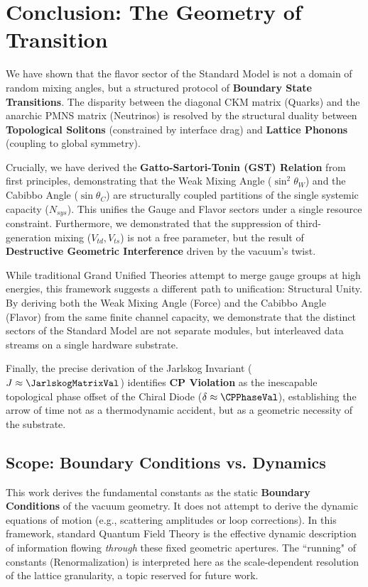 \section{Conclusion: The Geometry of Transition}

We have shown that the flavor sector of the Standard Model is not a domain of random mixing angles, but a structured protocol of \textbf{Boundary State Transitions}. The disparity between the diagonal CKM matrix (Quarks) and the anarchic PMNS matrix (Neutrinos) is resolved by the structural duality between \textbf{Topological Solitons} (constrained by interface drag) and \textbf{Lattice Phonons} (coupling to global symmetry).

Crucially, we have derived the \textbf{Gatto-Sartori-Tonin (GST) Relation} from first principles, demonstrating that the Weak Mixing Angle ($\sin^2 \theta_W$) and the Cabibbo Angle ($\sin \theta_C$) are structurally coupled partitions of the single systemic capacity ($N_{sys}$). This unifies the Gauge and Flavor sectors under a single resource constraint. Furthermore, we demonstrated that the suppression of third-generation mixing ($V_{td}, V_{ts}$) is not a free parameter, but the result of \textbf{Destructive Geometric Interference} driven by the vacuum's twist.

While traditional Grand Unified Theories attempt to merge gauge groups at high energies, this framework suggests a different path to unification: Structural Unity. By deriving both the Weak Mixing Angle (Force) and the Cabibbo Angle (Flavor) from the same finite channel capacity, we demonstrate that the distinct sectors of the Standard Model are not separate modules, but interleaved data streams on a single hardware substrate.

Finally, the precise derivation of the Jarlskog Invariant ($J \approx \JarlskogMatrixVal$) identifies \textbf{CP Violation} as the inescapable topological phase offset of the Chiral Diode ($\delta \approx \CPPhaseVal$), establishing the arrow of time not as a thermodynamic accident, but as a geometric necessity of the substrate.

\subsection{Scope: Boundary Conditions vs. Dynamics}
This work derives the fundamental constants as the static \textbf{Boundary Conditions} of the vacuum geometry. It does not attempt to derive the dynamic equations of motion (e.g., scattering amplitudes or loop corrections). In this framework, standard Quantum Field Theory is the effective dynamic description of information flowing \textit{through} these fixed geometric apertures. The ``running" of constants (Renormalization) is interpreted here as the scale-dependent resolution of the lattice granularity, a topic reserved for future work.

